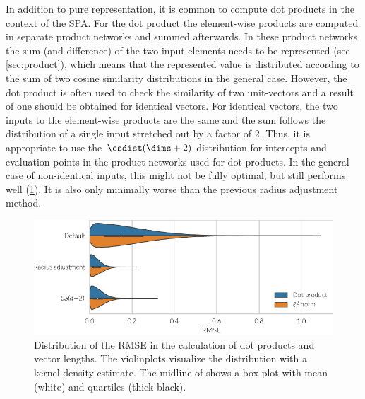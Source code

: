 In addition to pure representation, it is common to compute dot products in the context of the SPA\@.
For the dot product the element-wise products are computed in separate product networks and summed afterwards.
In these product networks the sum (and difference) of the two input elements needs to be represented (see \cref{sec:product}), which means that the represented value is distributed according to the sum of two cosine similarity distributions in the general case.
However, the dot product is often used to check the similarity of two unit-vectors and a result of one should be obtained for identical vectors.
For identical vectors, the two inputs to the element-wise products are the same and the sum follows the distribution of a single input stretched out by a factor of 2.
Thus, it is appropriate to use the $\csdist(\dims + 2)$ distribution for intercepts and evaluation points in the product networks used for dot products.
In the general case of non-identical inputs, this might not be fully optimal, but still performs well (\cref{fig:spaopt-dot}).
It is also only minimally worse than the previous radius adjustment method.
\begin{figure}
    \centering
    \includegraphics{figures/spaopt-dot}
    \caption[Distribution of the RMSE in dot product calculations]{Distribution of the RMSE in the calculation of dot products and vector lengths. The violinplots visualize the distribution with a kernel-density estimate. The midline of shows a box plot with mean (white) and quartiles (thick black).}\label{fig:spaopt-dot}
\end{figure}

